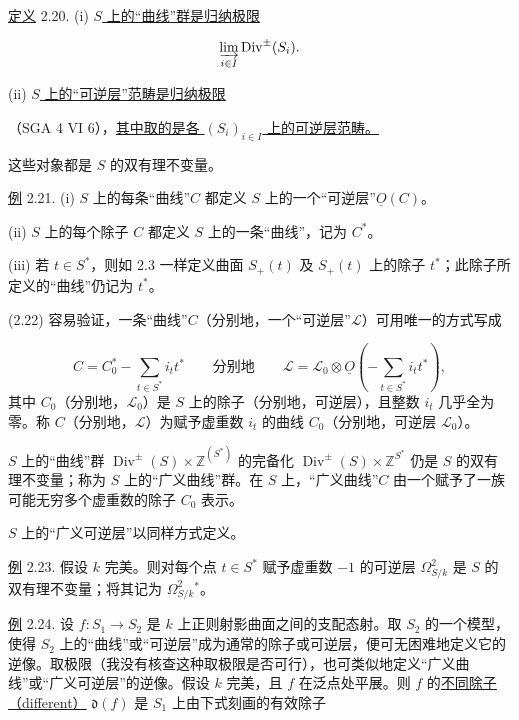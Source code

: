 \underline{定义} 2.20. (i) \underline{$S$ 上的“曲线”群是归纳极限}

\begin{equation*}
\varinjlim_{i\in I}\operatorname{Div}^{\pm}(S_i).
\end{equation*}

(ii) \underline{$S$ 上的“可逆层”范畴是归纳极限}


（SGA 4 VI 6），\underline{其中取的是各 $(S_i)_{i\in I}$ 上的可逆层范畴。}

这些对象都是 $S$ 的双有理不变量。

\underline{例} 2.21. (i) $S$ 上的每条“曲线”$C$ 都定义 $S$ 上的一个“可逆层”$\underline{O}(C)$。

(ii) $S$ 上的每个除子 $C$ 都定义 $S$ 上的一条“曲线”，记为 $C^*$。

(iii) 若 $t\in S^*$，则如 2.3 一样定义曲面 $S_+(t)$ 及 $S_+(t)$ 上的除子 $t^*$；此除子所定义的“曲线”仍记为 $t^*$。

(2.22) 容易验证，一条“曲线”$C$（分别地，一个“可逆层”$\mathcal L$）可用唯一的方式写成

\begin{equation*}
C=C_0^*-\sum_{t\in S^*}i_t t^*
\qquad\text{分别地}\qquad
\mathcal L=\mathcal L_0\otimes\underline{O}
\left(-\sum_{t\in S^*}i_t t^*\right),
\end{equation*}
其中 $C_0$（分别地，$\mathcal L_0$）是 $S$ 上的除子（分别地，可逆层），且整数 $i_t$ 几乎全为零。称 $C$（分别地，$\mathcal L$）为赋予虚重数 $i_t$ 的曲线 $C_0$（分别地，可逆层 $\mathcal L_0$）。

$S$ 上的“曲线”群 $\operatorname{Div}^{\pm}(S)\times\mathbb Z^{(S^*)}$ 的完备化 $\operatorname{Div}^{\pm}(S)\times\mathbb Z^{S^*}$ 仍是 $S$ 的双有理不变量；称为 $S$ 上的“广义曲线”群。在 $S$ 上，“广义曲线”$C$ 由一个赋予了一族可能无穷多个虚重数的除子 $C_0$ 表示。

$S$ 上的“广义可逆层”以同样方式定义。


\underline{例} 2.23. 假设 $k$ 完美。则对每个点 $t\in S^*$ 赋予虚重数 $-1$ 的可逆层 $\Omega^2_{S/k}$ 是 $S$ 的双有理不变量；将其记为 $\Omega^2_{S/k}{}^*$。

\underline{例} 2.24. 设 $f:S_1\longrightarrow S_2$ 是 $k$ 上正则射影曲面之间的支配态射。取 $S_2$ 的一个模型，使得 $S_2$ 上的“曲线”或“可逆层”成为通常的除子或可逆层，便可无困难地定义它的逆像。取极限（我没有核查这种取极限是否可行），也可类似地定义“广义曲线”或“广义可逆层”的逆像。假设 $k$ 完美，且 $f$ 在泛点处平展。则 $f$ 的\underline{不同除子（different）} $\mathfrak d(f)$ 是 $S_1$ 上由下式刻画的有效除子

